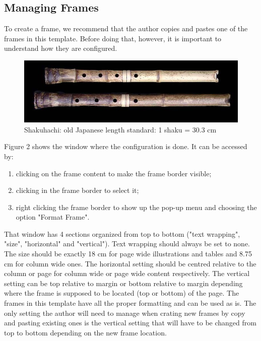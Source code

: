 \documentclass[10pt]{../imeko_acta}
\begin{document}
\subsection{Managing Frames}

To create a frame, we recommend that the author copies and pastes one of the frames in this template. Before doing that, however, it is important to understand how they are configured. 

\begin{figure}[!t]
	\centering
	\includegraphics[width=.9\linewidth]{wide_image}
	\caption{Shakuhachi: old Japanese length standard: 1 shaku = 30.3 cm}
	\label{fig:wideimage}
\end{figure}

Figure 2 shows the window where the configuration is done. It can be accessed by: 
\begin{enumerate}
	\item clicking on the frame content to make the frame border visible;
	\item clicking in the frame border to select it;
	\item right clicking the frame border to show up the pop-up menu and choosing the option "Format Frame".
\end{enumerate}

That window has 4 sections organized from top to bottom ("text wrapping", "size", "horizontal" and "vertical"). 
Text wrapping should always be set to none. The size should be exactly 18 cm for page wide illustrations and tables and 8.75 cm for column wide ones. The horizontal setting should be centred relative to the column or page for column wide or page wide content respectively. The vertical setting can be top relative to margin or bottom relative to margin depending where the frame is supposed to be located (top or bottom) of the page.
The frames in this template have all the proper formatting and can be used as is. The only setting the author will need to manage when crating new frames by copy and pasting existing ones is the vertical setting that will have to be changed from top to bottom depending on the new frame location.
\end{document}
